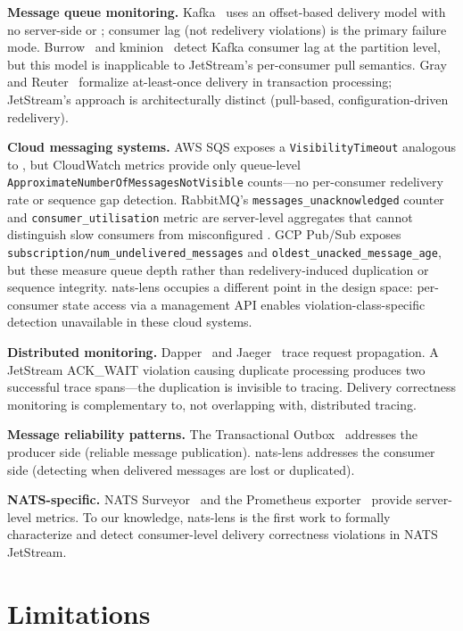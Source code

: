 \documentclass[sigconf,nonacm]{acmart}
\begin{document}
\textbf{Message queue monitoring.} Kafka~\cite{kafka} uses an offset-based
delivery model with no server-side  or ;
consumer lag (not redelivery violations) is the primary failure mode.
Burrow~\cite{burrow} and kminion~\cite{kminion} detect Kafka consumer lag
at the partition level, but this model is inapplicable to JetStream's
per-consumer pull semantics. Gray and Reuter~\cite{gray1992} formalize
at-least-once delivery in transaction processing; JetStream's approach is
architecturally distinct (pull-based, configuration-driven redelivery).

\textbf{Cloud messaging systems.} AWS SQS exposes a
\texttt{VisibilityTimeout} analogous to , but CloudWatch
metrics provide only queue-level \texttt{ApproximateNumberOfMessagesNotVisible}
counts---no per-consumer redelivery rate or sequence gap detection.
RabbitMQ's \texttt{messages\_unacknowledged} counter and
\texttt{consumer\_utilisation} metric are server-level aggregates that
cannot distinguish slow consumers from misconfigured .
GCP Pub/Sub exposes \texttt{subscription/num\_undelivered\_messages} and
\texttt{oldest\_unacked\_message\_age}, but these measure queue depth rather
than redelivery-induced duplication or sequence integrity. nats-lens occupies
a different point in the design space: per-consumer state access via a
management API enables violation-class-specific detection unavailable in
these cloud systems.

\textbf{Distributed monitoring.} Dapper~\cite{dapper} and Jaeger~\cite{jaeger}
trace request propagation. A JetStream ACK\_WAIT violation causing duplicate
processing produces two successful trace spans---the duplication is invisible
to tracing. Delivery correctness monitoring is complementary to, not
overlapping with, distributed tracing.

\textbf{Message reliability patterns.} The Transactional Outbox~\cite{outbox}
addresses the producer side (reliable message publication). nats-lens
addresses the consumer side (detecting when delivered messages are lost or
duplicated).

\textbf{NATS-specific.} NATS Surveyor~\cite{surveyor} and the Prometheus
exporter~\cite{prometheus-nats} provide server-level metrics. To our knowledge,
nats-lens is the first work to formally characterize and detect consumer-level
delivery correctness violations in NATS JetStream.

\section{Limitations}
\end{document}

